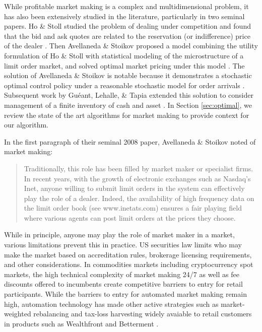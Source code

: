 \documentclass{article}
\begin{document}
While profitable market making is a complex and multidimensional problem, it has also been extensively studied in the literature, particularly in two seminal papers. Ho \& Stoll studied the problem of dealing under competition and found that the bid and ask quotes are related to the reservation (or indifference) price of the dealer \cite{ho1980on}. Then Avellaneda \& Stoikov proposed a model combining the utility formulation of Ho \& Stoll with statistical modeling of the microstructure of a limit order market, and solved optimal market pricing under this model \cite{avellaneda2008high}. The solution of Avellaneda \& Stoikov is notable because it demonstrates a stochastic optimal control policy under a reasonable stochastic model for order arrivals \cite{bouchard2002statistical}. Subsequent work by Guéant, Lehalle, \& Tapia extended this solution to consider management of a finite inventory of cash and asset \cite{guéant2012dealing}. In Section \ref{sec:optimal}, we review the state of the art algorithms for market making to provide context for our algorithm.

In the first paragraph of their seminal 2008 paper, Avellaneda \& Stoikov noted of market making:

\begin{quote}
Traditionally, this role has been filled by market maker or specialist firms. In recent years, with the growth of electronic exchanges such as Nasdaq’s Inet, anyone willing to submit limit orders in the system can effectively play the role of a dealer. Indeed, the availability of high frequency data on the limit order book (see www.inetats.com) ensures a fair playing field where various agents can post limit orders at the prices they choose.
\end{quote}

While in principle, anyone may play the role of market maker in a market, various limitations prevent this in practice. US securities law limits who may make the market based on accreditation rules, brokerage licensing requirements, and other considerations. In commodities markets including cryptocurrency spot markets, the high technical complexity of market making 24/7 as well as fee discounts offered to incumbents create competitive barriers to entry for retail participants. While the barriers to entry for automated market making remain high, automation technology has made other active strategies such as market-weighted rebalancing and tax-loss harvesting widely avaiable to retail customers in products such as Wealthfront and Betterment \cite{wealthfront, betterment}.
\end{document}
